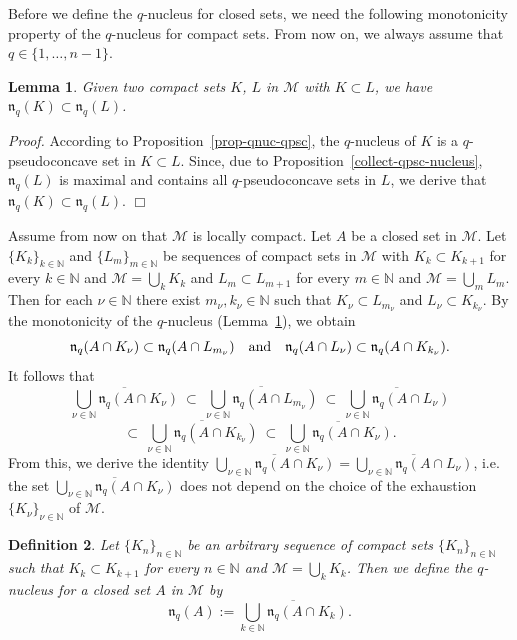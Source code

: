\documentclass[11pt,a4paper]{article}
\newtheorem{lem}{Lemma}[section]
\newtheorem{defn}[lem]{Definition}
\newenvironment{proof}{\noindent\textit{Proof. }}{\hfill $\Box$\linebreak}
\newcommand{\D}{\displaystyle}
\newcommand{\NN}{\mathbb{N}}
\newcommand{\Mcal}{\mathcal{M}}
\newcommand{\nuc}{\mathfrak{n}}
\newcommand{\qand}{\quad \hbox{and} \quad}
\begin{document}
Before we define the $q$-nucleus for closed sets, we need the following monotonicity property of the $q$-nucleus for compact sets. From now on, we always assume that $q\in\{1,\ldots,n-1\}$. 

\begin{lem}\label{lem-monoton-qnuc} Given two compact sets $K$, $L$ in $\Mcal$ with $K \subset L$, we have $\nuc_q(K) \subset \nuc_q(L)$.
\end{lem}

\begin{proof} According to Proposition~\ref{prop-qnuc-qpsc}, the $q$-nucleus of $K$ is a $q$-pseudoconcave set in $K \subset L$. Since, due to Proposition~\ref{collect-qpsc-nucleus}, $\nuc_q(L)$ is maximal and contains all $q$-pseudoconcave sets in $L$, we derive that $\nuc_q(K) \subset \nuc_q(L)$.
\end{proof}

Assume from now on that $\Mcal$ is locally compact. Let $A$ be a closed set in $\Mcal$. Let $\{K_k\}_{k \in \NN}$ and $\{L_m\}_{m \in \NN}$ be sequences of compact sets in $\Mcal$ with $K_k \subset K_{k+1}$ for every $k \in \NN$ and $\Mcal=\bigcup_k K_k$ and $L_m \subset L_{m+1}$ for every $m \in \NN$ and $\Mcal=\bigcup_m L_m$. Then for each $\nu \in \NN$ there exist $m_\nu, k_\nu \in \NN$ such that $K_\nu \subset L_{m_\nu}$ and $L_\nu \subset K_{k_\nu}$. By the monotonicity of the $q$-nucleus (Lemma~\ref{lem-monoton-qnuc}), we obtain
\[
\nuc_q(A \cap K_{\nu}) \subset \nuc_q(A \cap L_{m_\nu}) \qand \nuc_q(A \cap L_\nu) \subset \nuc_q(A \cap K_{k_\nu}).
\]
It follows that
\[
\overline{ \bigcup_{\nu \in \NN} \nuc_q(A \cap K_{\nu})} \ \subset\ \overline{ \bigcup_{\nu \in \NN} \nuc_q(A \cap L_{m_\nu})} \ \subset\ \overline{ \bigcup_{\nu \in \NN} \nuc_q(A \cap L_{\nu})}
\]
\[
 \subset\ \overline{ \bigcup_{\nu \in \NN} \nuc_q(A \cap K_{k_\nu})} \ \subset\ \overline{ \bigcup_{\nu \in \NN} \nuc_q(A \cap K_{\nu})}.
\]
From this, we derive the identity $\D \overline{ \bigcup_{\nu \in \NN} \nuc_q(A \cap K_{\nu})} = \overline{ \bigcup_{\nu \in \NN} \nuc_q(A \cap L_{\nu})}$, i.e. the set $\D \overline{ \bigcup_{\nu \in \NN} \nuc_q(A \cap K_{\nu})}$ does not depend on the choice of the exhaustion  $\{K_\nu\}_{\nu \in \NN}$ of $\Mcal$.

\begin{defn}\label{defn-closed-q-nucleus} Let $\{K_n\}_{n \in \NN}$ be an arbitrary sequence of compact sets $\{K_n\}_{n \in \NN}$ such that $K_k \subset K_{k+1}$ for every $n \in \NN$ and $\Mcal = \bigcup_{k} K_k$. Then we define the \emph{$q$-nucleus for a closed set $A$ in $\Mcal$} by
\[
\nuc_q(A):= \overline{ \bigcup_{k \in \NN} \nuc_q(A \cap K_k)}.
\]
\end{defn}
\end{document}
